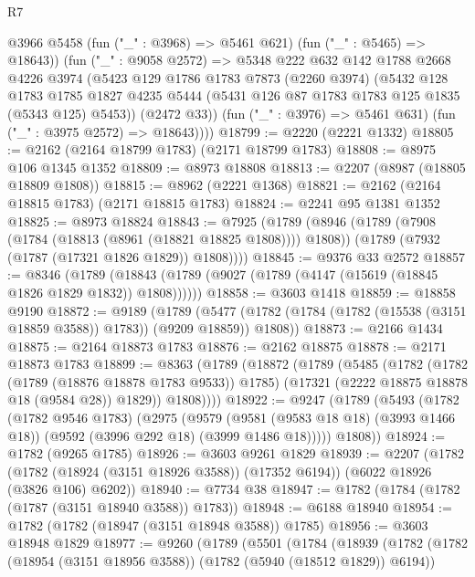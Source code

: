 \begin{lexlean}{R7}
\begin{coremodule}
          @3966
          @5458
          (fun ("_" : @3968) => @5461 @621)
          (fun ("_" : @5465) => @18643))
        (fun ("_" : @9058 @2572) =>
        @5348
          @222
          @632
          @142
          @1788
          @2668
          @4226
          @3974
          (@5423
            @129
            @1786
            @1783
            @7873
            (@2260 @3974)
            (@5432
              @128
              @1783
              @1785
              @1827
              @4235
              @5444
              (@5431 @126 @87 @1783 @1783 @125 @1835 (@5343 @125) @5453))
            (@2472 @33))
          (fun ("_" : @3976) => @5461 @631)
          (fun ("_" : @3975 @2572) => @18643))))
@18799 := @2220 (@2221 @1332)
@18805 := @2162 (@2164 @18799 @1783) (@2171 @18799 @1783)
@18808 := @8975 @106 @1345 @1352
@18809 := @8973 @18808
@18813 := @2207 (@8987 (@18805 @18809 @1808))
@18815 := @8962 (@2221 @1368)
@18821 := @2162 (@2164 @18815 @1783) (@2171 @18815 @1783)
@18824 := @2241 @95 @1381 @1352
@18825 := @8973 @18824
@18843 := @7925
    (@1789
      (@8946
        (@1789 (@7908 (@1784 (@18813 (@8961 (@18821 @18825 @1808)))) @1808))
        (@1789 (@7932 (@1787 (@17321 @1826 @1829)) @1808))))
@18845 := @9376 @33 @2572
@18857 := @8346
    (@1789 (@18843 (@1789 (@9027 (@1789 (@4147 (@15619 (@18845 @1826 @1829 @1832)) @1808))))))
@18858 := @3603 @1418
@18859 := @18858 @9190
@18872 := @9189
    (@1789 (@5477 (@1782 (@1784 (@1782 (@15538 (@3151 @18859 @3588)) @1783)) (@9209 @18859)) @1808))
@18873 := @2166 @1434
@18875 := @2164 @18873 @1783
@18876 := @2162 @18875
@18878 := @2171 @18873 @1783
@18899 := @8363
    (@1789
      (@18872
        (@1789
          (@5485
            (@1782
              (@1782 (@1789 (@18876 @18878 @1783 @9533)) @1785)
              (@17321 (@2222 @18875 @18878 @18 (@9584 @28)) @1829))
            @1808))))
@18922 := @9247
    (@1789
      (@5493
        (@1782
          (@1782 @9546 @1783)
          (@2975
            (@9579
              (@9581 (@9583 @18 @18) (@3993 @1466 @18))
              (@9592 (@3996 @292 @18) (@3999 @1486 @18)))))
        @1808))
@18924 := @1782 (@9265 @1785)
@18926 := @3603 @9261 @1829
@18939 := @2207
    (@1782 (@1782 (@18924 (@3151 @18926 @3588)) (@17352 @6194)) (@6022 @18926 (@3826 @106) @6202))
@18940 := @7734 @38
@18947 := @1782 (@1784 (@1782 (@1787 (@3151 @18940 @3588)) @1783))
@18948 := @6188 @18940
@18954 := @1782 (@1782 (@18947 (@3151 @18948 @3588)) @1785)
@18956 := @3603 @18948 @1829
@18977 := @9260
    (@1789
      (@5501
        (@1784
          (@18939
            (@1782
              (@1782 (@18954 (@3151 @18956 @3588)) (@1782 (@5940 (@18512 @1829)) @6194))

\end{coremodule}
\end{lexlean}
